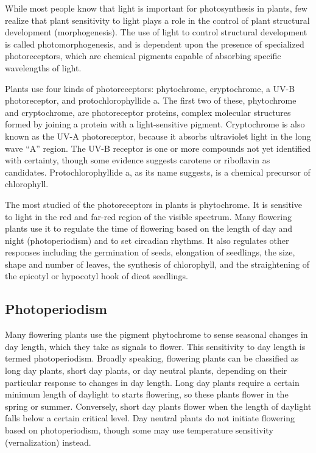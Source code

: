 While most people know that light is important for photosynthesis in plants, few realize that plant sensitivity to light plays a role in the control of plant structural development (morphogenesis). The use of light to control structural development is called photomorphogenesis, and is dependent upon the presence of specialized photoreceptors, which are chemical pigments capable of absorbing specific wavelengths of light.

Plants use four kinds of photoreceptors: phytochrome, cryptochrome, a UV-B photoreceptor, and protochlorophyllide a. The first two of these, phytochrome and cryptochrome, are photoreceptor proteins, complex molecular structures formed by joining a protein with a light-sensitive pigment. Cryptochrome is also known as the UV-A photoreceptor, because it absorbs ultraviolet light in the long wave ``A'' region. The UV-B receptor is one or more compounds not yet identified with certainty, though some evidence suggests carotene or riboflavin as candidates. Protochlorophyllide a, as its name suggests, is a chemical precursor of chlorophyll.

The most studied of the photoreceptors in plants is phytochrome. It is sensitive to light in the red and far-red region of the visible spectrum. Many flowering plants use it to regulate the time of flowering based on the length of day and night (photoperiodism) and to set circadian rhythms. It also regulates other responses including the germination of seeds, elongation of seedlings, the size, shape and number of leaves, the synthesis of chlorophyll, and the straightening of the epicotyl or hypocotyl hook of dicot seedlings.

\hypertarget{photoperiodism}{%
\subsection{Photoperiodism}\label{photoperiodism}}

Many flowering plants use the pigment phytochrome to sense seasonal changes in day length, which they take as signals to flower. This sensitivity to day length is termed photoperiodism. Broadly speaking, flowering plants can be classified as long day plants, short day plants, or day neutral plants, depending on their particular response to changes in day length. Long day plants require a certain minimum length of daylight to starts flowering, so these plants flower in the spring or summer. Conversely, short day plants flower when the length of daylight falls below a certain critical level. Day neutral plants do not initiate flowering based on photoperiodism, though some may use temperature sensitivity (vernalization) instead.

